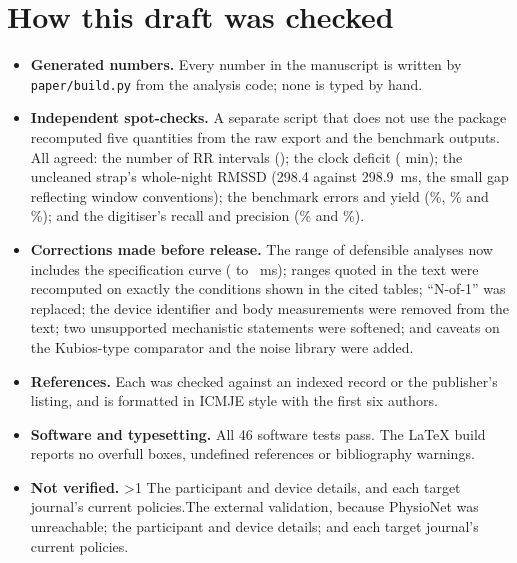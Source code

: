 \documentclass[11pt,a4paper]{article}
\newcommand{\cmd}[1]{\texttt{\small #1}}
\begin{document}
\section{How this draft was checked}
\begin{itemize}
\item \textbf{Generated numbers.} Every number in the manuscript is written by \cmd{paper/build.py} from the analysis code; none is typed by hand.
\item \textbf{Independent spot-checks.} A separate script that does not use the package recomputed five quantities from the raw export and the benchmark outputs. All agreed: the number of RR intervals (\nRR); the clock deficit (\clockDeficitMin{} min); the uncleaned strap's whole-night RMSSD (298.4 against 298.9~ms, the small gap reflecting window conventions); the benchmark errors and yield (\benchProposedTen\%, \benchKubiosTen\% and \benchProposedYieldTwenty\%); and the digitiser's recall and precision (\digRecall\% and \digPrecision\%).
\item \textbf{Corrections made before release.} The range of defensible analyses now includes the specification curve (\pitDefMin{} to \pitDefMax{}~ms); ranges quoted in the text were recomputed on exactly the conditions shown in the cited tables; ``N-of-1'' was replaced; the device identifier and body measurements were removed from the text; two unsupported mechanistic statements were softened; and caveats on the Kubios-type comparator and the noise library were added.
\item \textbf{References.} Each was checked against an indexed record or the publisher's listing, and is formatted in ICMJE style with the first six authors.
\item \textbf{Software and typesetting.} All 46 software tests pass. The LaTeX build reports no overfull boxes, undefined references or bibliography warnings.
\item \textbf{Not verified.} \ifnum\mitRecords>1 The participant and device details, and each target journal's current policies.\else The external validation, because PhysioNet was unreachable; the participant and device details; and each target journal's current policies.\fi
\end{itemize}

\printbibliography[title={References}]
\end{document}

